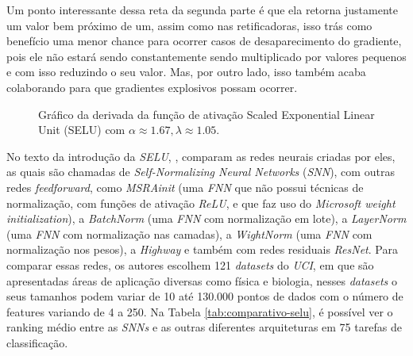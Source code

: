Um ponto interessante dessa reta da segunda parte é que ela retorna justamente um valor bem próximo de um, assim como nas retificadoras, isso trás como benefício uma menor chance para ocorrer casos de desaparecimento do gradiente, pois ele não estará sendo constantemente sendo multiplicado por valores pequenos e com isso reduzindo o seu valor. Mas, por outro lado, isso também acaba colaborando para que gradientes explosivos possam ocorrer.

\begin{figure}[h!]
    \centering
    \caption{Gráfico da derivada da função de ativação Scaled Exponential Linear Unit (SELU) com $\alpha \approx 1.67, \lambda \approx 1.05$.}
    \label{fig:selu-derivada}
\end{figure}

No texto da introdução da \textit{SELU}, \textcite{SELUArticle}, comparam as redes neurais criadas por eles, as quais são chamadas de \textit{Self-Normalizing Neural Networks} (\textit{SNN}), com outras redes \textit{feedforward}, como \textit{MSRAinit} (uma \textit{FNN} que não possui técnicas de normalização, com funções de ativação \textit{ReLU}, e que faz uso do \textit{Microsoft weight initialization}), a \textit{BatchNorm} (uma \textit{FNN} com normalização em lote), a \textit{LayerNorm} (uma \textit{FNN} com normalização nas camadas), a \textit{WightNorm} (uma \textit{FNN} com normalização nos pesos), a \textit{Highway} e também com redes residuais \textit{ResNet}. Para comparar essas redes, os autores escolhem 121 \textit{datasets} do \textit{UCI}, em que são apresentadas áreas de aplicação diversas como física e biologia, nesses \textit{datasets} o seus tamanhos podem variar de 10 até 130.000 pontos de dados com o número de features variando de 4 a 250. Na Tabela \ref{tab:comparativo-selu}, é possível ver o ranking médio entre as \textit{SNNs} e as outras diferentes arquiteturas em 75 tarefas de classificação.

